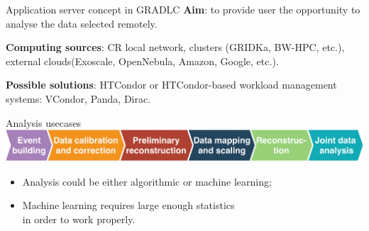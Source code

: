 
\begin{frame}{Application server concept in GRADLC}
\textbf{Aim}: to provide user the opportunity to analyse the data selected remotely.

\textbf{Computing sources}: CR local network, clusters (GRIDKa, BW-HPC, etc.), external clouds(Exoscale, OpenNebula, Amazon, Google, etc.).

\textbf{Possible solutions}: HTCondor or HTCondor-based workload management systems: VCondor, Panda, Dirac. 

\end{frame}


\begin{frame}{Analysis usecases}
    \includegraphics[width=1\textwidth]{pics/an_steps.pdf}
    \vspace{2em}
    \begin{itemize}
        \item Analysis could be either algorithmic or machine learning;
        \item Machine learning requires large enough statistics\\in order to work properly.
    \end{itemize}
\end{frame}


